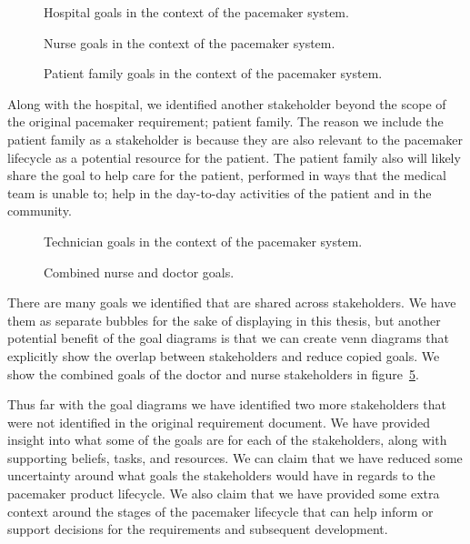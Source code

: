 \begin{figure}
	\centering
	
	\caption{Hospital goals in the context of the pacemaker system.}
	\label{fig:hospital_goals}
\end{figure}

\begin{figure}
	\centering
	
	\caption{Nurse goals in the context of the pacemaker system.}
	\label{fig:nurse_goals}
\end{figure}

\begin{figure}
	\centering
	
	\caption{Patient family goals in the context of the pacemaker system.}
	\label{fig:patient_family_goals}
\end{figure}

Along with the hospital, we identified another stakeholder beyond the scope of the original pacemaker requirement; patient family. The reason we include the patient family as a stakeholder is because they are also relevant to the pacemaker lifecycle as a potential resource for the patient. The patient family also will likely share the goal to help care for the patient, performed in ways that the medical team is unable to; help in the day-to-day activities of the patient and in the community.

\begin{figure}
	\centering
	
	\caption{Technician goals in the context of the pacemaker system.}
	\label{fig:technician_goals}
\end{figure}

\begin{figure}
	\centering
	
	\caption{Combined nurse and doctor goals.}
	\label{fig:nurse_doctor_combined}
\end{figure}

There are many goals we identified that are shared across stakeholders. We have them as separate bubbles for the sake of displaying in this thesis, but another potential benefit of the goal diagrams is that we can create venn diagrams that explicitly show the overlap between stakeholders and reduce copied goals. We show the combined goals of the doctor and nurse stakeholders in figure~\ref{fig:nurse_doctor_combined}.

Thus far with the goal diagrams we have identified two more stakeholders that were not identified in the original requirement document. We have provided insight into what some of the goals are for each of the stakeholders, along with supporting beliefs, tasks, and resources. We can claim that we have reduced some uncertainty around what goals the stakeholders would have in regards to the pacemaker product lifecycle. We also claim that we have provided some extra context around the stages of the pacemaker lifecycle that can help inform or support decisions for the requirements and subsequent development.

